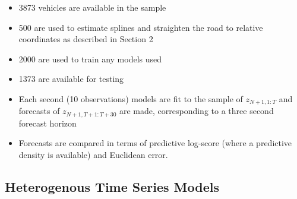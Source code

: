 \documentclass[12pt,a4paper]{article}\usepackage[]{graphicx}\usepackage[]{color}
\begin{document}
\begin{itemize}
\item 3873 vehicles are available in the sample
\item 500 are used to estimate splines and straighten the road to relative coordinates as described in Section 2
\item 2000 are used to train any models used
\item 1373 are available for testing
\item Each second (10 observations) models are fit to the sample of $z_{N+1, 1:T}$ and forecasts of $z_{N+1, T+1:T+30}$ are made, corresponding to a three second forecast horizon
\item Forecasts are compared in terms of predictive log-score (where a predictive density is available) and Euclidean error.
\end{itemize}

\subsection{Heterogenous Time Series Models}
\end{document}
